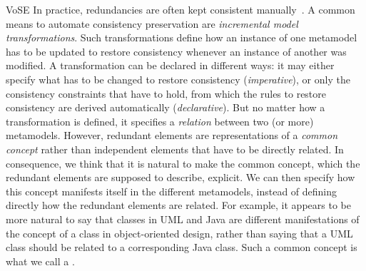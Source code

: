 \begin{copiedFrom}{VoSE}
In practice, redundancies are often kept consistent manually~\cite{sax2017survey, guissouma2018study}.
A common means to automate consistency preservation are \emph{incremental model transformations}.
Such transformations define how an instance of one metamodel has to be updated to restore consistency whenever an instance of another was modified.
A transformation can be declared in different ways: %
it may either specify what has to be changed to restore consistency %
(\emph{imperative}), or only the consistency constraints that have to hold, from which the rules to restore consistency are derived automatically (\emph{declarative}).
But no matter how a transformation is defined, it specifies a \emph{relation} between two (or more) metamodels.
However, redundant elements are representations of a \emph{common concept} rather than independent elements that have to be directly related.
In consequence, we think that it is natural to make the common concept, which the redundant elements are supposed to describe, explicit. 
We can then specify how this concept manifests itself in the different metamodels, instead of defining directly how the redundant elements are related.
For example, %
it appears to be more natural to say that classes in UML and Java are different manifestations of the concept of a class in object-oriented design, rather than saying that a UML class should be related to a corresponding Java class.
Such a common concept is what we call a \emph{\commonality}.



\end{copiedFrom}
